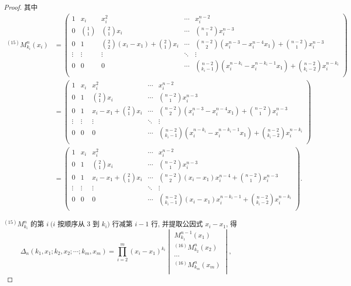 \documentclass[color=black,device=normal,lang=cn,mode=geye]{elegantnote}
\begin{document}
\begin{landscape}
\begin{proof}
    其中
    \begin{align*}
        ^{(15)}M_{k_i}^n(x_i) & =\begin{pmatrix}
            1 & x_i & x_i^2 & \cdots & x_i^{n-2} \\[4pt]
            0 & \binom{1}{1} & \binom{2}{1}x_i & \cdots & \binom{n-2}{1}x_i^{n-3} \\[10pt]
            0 & 1 & \binom{2}{2}(x_i-x_1)+\binom{2}{1}x_i & \cdots & \binom{n-2}{2}(x_i^{n-3}-x_i^{n-4}x_1)+\binom{n-2}{1}x_i^{n-3} \\
            \vdots & \vdots & \vdots & \ddots & \vdots \\[4pt]
            0 & 0 & 0 & \cdots & \binom{n-2}{k_i-1}(x_i^{n-k_i}-x_i^{n-k_i-1}x_1)+\binom{n-2}{k_i-2}x_i^{n-k_i} \\
        \end{pmatrix} \\
        & =\begin{pmatrix}
            1 & x_i & x_i^2 & \cdots & x_i^{n-2} \\[4pt]
            0 & 1 & \binom{2}{1}x_i & \cdots & \binom{n-2}{1}x_i^{n-3} \\[10pt]
            0 & 1 & x_i-x_1+\binom{2}{1}x_i & \cdots & \binom{n-2}{2}(x_i^{n-3}-x_i^{n-4}x_1)+\binom{n-2}{1}x_i^{n-3} \\
            \vdots & \vdots & \vdots & \ddots & \vdots \\[4pt]
            0 & 0 & 0 & \cdots & \binom{n-2}{k_i-1}(x_i^{n-k_i}-x_i^{n-k_i-1}x_1)+\binom{n-2}{k_i-2}x_i^{n-k_i} \\
        \end{pmatrix} \\
        & =\begin{pmatrix}
            1 & x_i & x_i^2 & \cdots & x_i^{n-2} \\[4pt]
            0 & 1 & \binom{2}{1}x_i & \cdots & \binom{n-2}{1}x_i^{n-3} \\[10pt]
            0 & 1 & x_i-x_1+\binom{2}{1}x_i & \cdots & \binom{n-2}{2}(x_i-x_1)x_i^{n-4}+\binom{n-2}{1}x_i^{n-3} \\
            \vdots & \vdots & \vdots & \ddots & \vdots \\[4pt]
            0 & 0 & 0 & \cdots & \binom{n-2}{k_i-1}(x_i-x_1)x_i^{n-k_i-1}+\binom{n-2}{k_i-2}x_i^{n-k_i} \\
        \end{pmatrix}.
    \end{align*}

    $^{(15)}M_{k_i}^n$ 的第 $i\ (i$ 按顺序从 $3$ 到 $k_i)$ 行减第 $i-1$ 行, 并提取公因式 $x_i-x_1$, 得
    \[\Delta_n(k_1,x_1;k_2,x_2;\cdots;k_m,x_m)=\prod\limits_{i=2}^m(x_i-x_1)^{k_i}\begin{vmatrix}
        M_{k_1}^{n-1}(x_1) \\
        ^{(16)}M_{k_2}^n(x_2) \\
        \cdots \\
        ^{(16)}M_{k_m}^n(x_m) \\
    \end{vmatrix},\]


\end{proof}
\end{landscape}
\end{document}

